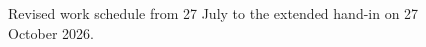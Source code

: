 \documentclass[12pt,a4paper]{report}
\begin{document}
\begin{landscape}
\begin{figure}[p]
\begin{ganttchart}
\end{ganttchart}
\caption{Revised work schedule from 27 July to the extended hand-in on 27 October 2026.}
\end{figure}
\end{landscape}
\end{document}
